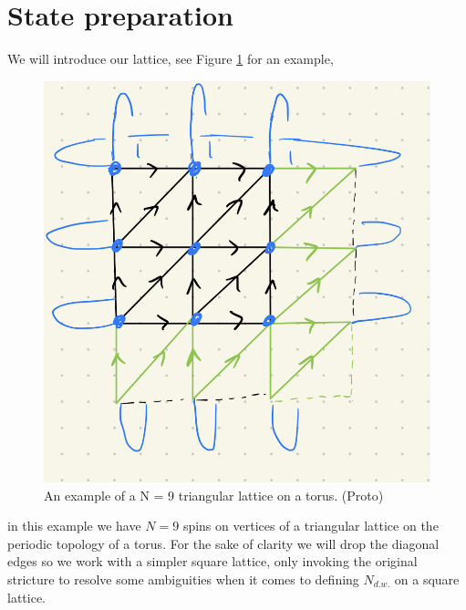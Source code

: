 \documentclass[a4paper,twocolumn,11pt]{quantumarticle}
\begin{document}
\section{State preparation}

We will introduce our lattice, see Figure \ref{fig:3x3pbc} for an example,
\begin{figure}
\centering
\includegraphics[width=\linewidth]{Figures/3x3_pbc.png}
\caption{An example of a N = 9 triangular lattice on a torus. (Proto)}
\label{fig:3x3pbc}
\end{figure}
in this example we have $N = 9$ spins on vertices of a triangular lattice on the periodic topology of a torus. For the sake of clarity we will drop the diagonal edges so we work with a simpler square lattice, only invoking the original stricture to resolve some ambiguities when it comes to defining $N_{d.w.}$ on a square lattice.
\end{document}
